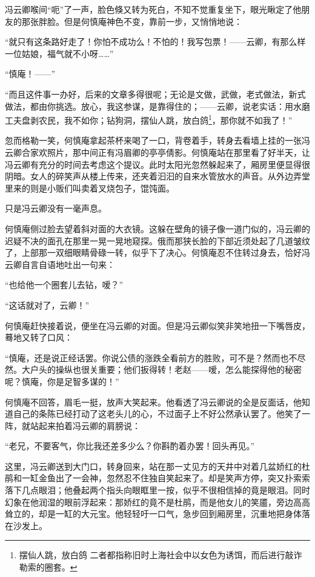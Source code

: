 \par 冯云卿喉间“呃”了一声，脸色倏又转为死白，不知不觉重复坐下，眼光瞅定了他朋友的那张胖脸。但是何慎庵神色不变，靠前一步，又悄悄地说：
\par “就只有这条路好走了！你怕不成功么！不怕的！我写包票！——云卿，有那么样一位姑娘，福气就不小呀……”
\par “慎庵！——”
\par “而且这件事一办好，后来的文章多得很呢；无论是文做，武做，老式做法，新式做法，都由你挑选。放心，我这参谋，是靠得住的；——云卿，说老实话：用水磨工夫盘剥农民，我不如你；钻狗洞，摆仙人跳，放白鸽\footnote{摆仙人跳，放白鸽 二者都指称旧时上海社会中以女色为诱饵，而后进行敲诈勒索的圈套。}，那你就不如我了！”
\par 忽而格勒一笑，何慎庵拿起茶杯来喝了一口，背卷着手，转身去看墙上挂的一张冯云卿合家欢照片，那中间正有冯眉卿的亭亭倩影。何慎庵站在那里看了好半天，让冯云卿有充分的时间去考虑这个提议。此时太阳光忽然躲起来了，厢房里便显得很阴暗。女人的碎笑声从楼上传来，还夹着汩汩的自来水管放水的声音。从外边弄堂里来的则是小贩们叫卖着叉烧包子，馄饨面。
\par 只是冯云卿没有一毫声息。
\par 何慎庵侧过脸去望着斜对面的大衣镜。这躲在壁角的镜子像一道门似的，冯云卿的迟疑不决的面孔在那里一晃一晃地窥探。俄而那狭长脸的下部近须处起了几道皱纹了，上部那一双细眼睛骨碌一转，似乎下了决心。何慎庵忍不住转过身去，恰好冯云卿自言自语地吐出一句来：
\par “也给他一个圈套儿去钻，嗳？”
\par “这话就对了，云卿！”
\par 何慎庵赶快接着说，便坐在冯云卿的对面。但是冯云卿似笑非笑地扭一下嘴唇皮，蓦地又转了口风：
\par “慎庵，还是说正经话罢。你说公债的涨跌全看前方的胜败，可不是？然而也不尽然。大户头的操纵也很关重要；他们扳得转！老赵——嗳，怎么能探得他的秘密呢？慎庵，你是足智多谋的！”
\par 何慎庵不回答，眉毛一挺，放声大笑起来。他看透了冯云卿说的全是反面话，他知道自己的条陈已经打动了这老头儿的心，不过面子上不好公然承认罢了。他笑了一阵，就站起来拍着冯云卿的肩膀说：
\par “老兄，不要客气，你比我还差多少么？你斟酌着办罢！回头再见。”
\par 这里，冯云卿送到大门口，转身回来，站在那一丈见方的天井中对着几盆娇红的杜鹃和一缸金鱼出了一会神，忽然忍不住独自笑起来了。却是笑声方停，突又扑索索落下几点眼泪；他叠起两个指头向眼眶里一按，似乎不很相信掉的竟是眼泪。同时幻象在他润湿的眼前浮起来：那娇红的竟不是杜鹃，而是他女儿的笑靥，旁边高高耸立的，却是一缸的大元宝。他轻轻吁一口气，急步回到厢房里，沉重地把身体落在沙发上。
